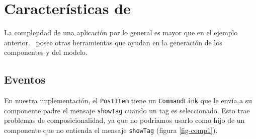 \section{Características de \PITS}

La complejidad de una aplicación por lo general es mayor que en el ejemplo anterior. \PWB\ posee otras herramientas que ayudan en la generación de los componentes y del modelo.




\subsection{Eventos}
\label{sub-events}

En nuestra implementación, el \verb"PostItem" tiene un \verb"CommandLink" que le envía a su componente padre el mensaje \verb"showTag" cuando un tag es seleccionado. Esto trae problemas de composicionalidad, ya que no podríamos usarlo como hijo de un componente que no entienda el mensaje \verb"showTag"  (figura \ref{fig-comp1}).

